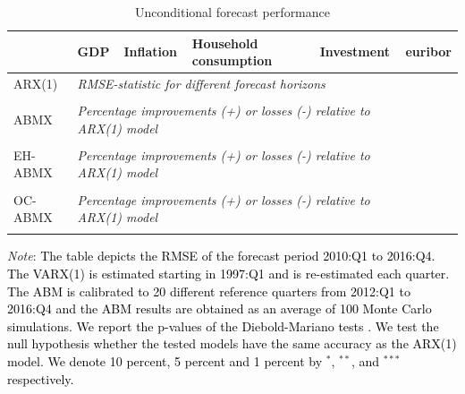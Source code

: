 {\begin{table}[!h]
	\caption{Unconditional forecast performance } 
	\label{table:rmse_abmx_uf}
	\centering
		\begin{tabular}{llllll}
			\toprule
			& GDP & Inflation & Household consumption & Investment & euribor\\
			\midrule
			ARX(1) & \multicolumn{4}{l}{\textit{RMSE-statistic for different forecast horizons}} \\ \midrule
			 \\ \midrule
           ABMX & \multicolumn{4}{l}{\textit{Percentage improvements (+) or losses (-) relative to ARX(1) model}} \\ \midrule
           	 \\ \midrule
           EH-ABMX & \multicolumn{4}{l}{\textit{Percentage improvements (+) or losses (-) relative to ARX(1) model}} \\ \midrule
			 \\ \midrule
			OC-ABMX & \multicolumn{4}{l}{\textit{Percentage improvements (+) or losses (-) relative to ARX(1) model}} \\ \midrule
			
			\\ \bottomrule
		\end{tabular}
	\begin{tablenotes}
		\footnotesize \item \textit{Note}: \textcolor{black}{The table depicts the RMSE of the forecast period 2010:Q1 to 201\textcolor{black}{6}:Q4. The VARX(1) is estimated starting in 1997:Q1 and is re-estimated each quarter. The ABM is calibrated to \textcolor{black}{20} different reference quarters from 2012:Q1 to \textcolor{black}{2016:Q4} and the ABM results are obtained as an average of 100 Monte Carlo simulations. We report the p-values of the Diebold-Mariano tests \citep{harveyTestingEqualityPrediction1997}.  We test the null hypothesis whether the tested models have the same accuracy as the ARX(1) model. We denote  10 percent, 5 percent and 1 percent by $^{*}$, $^{**}$, and $^{***}$ respectively.}
	\end{tablenotes}
\end{table}



\clearpage
}

